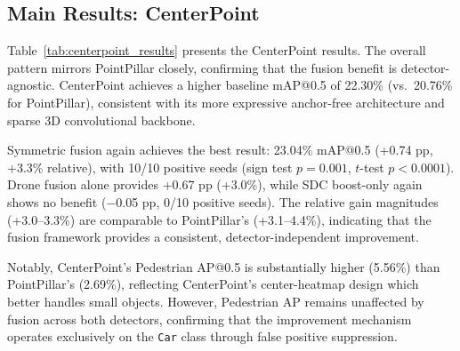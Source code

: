 \documentclass[sustainability,article,submit,moreauthors,pdftex]{Definitions/mdpi}
\begin{document}
\subsection{Main Results: CenterPoint}

Table~\ref{tab:centerpoint_results} presents the CenterPoint results. The overall pattern mirrors PointPillar closely, confirming that the fusion benefit is detector-agnostic. CenterPoint achieves a higher baseline mAP@0.5 of 22.30\% (vs.\ 20.76\% for PointPillar), consistent with its more expressive anchor-free architecture and sparse 3D convolutional backbone.

Symmetric fusion again achieves the best result: 23.04\% mAP@0.5 (+0.74 pp, +3.3\% relative), with 10/10 positive seeds (sign test $p = 0.001$, $t$-test $p < 0.0001$). Drone fusion alone provides +0.67 pp (+3.0\%), while SDC boost-only again shows no benefit ($-$0.05 pp, 0/10 positive seeds). The relative gain magnitudes (+3.0--3.3\%) are comparable to PointPillar's (+3.1--4.4\%), indicating that the fusion framework provides a consistent, detector-independent improvement.

Notably, CenterPoint's Pedestrian AP@0.5 is substantially higher (5.56\%) than PointPillar's (2.69\%), reflecting CenterPoint's center-heatmap design which better handles small objects. However, Pedestrian AP remains unaffected by fusion across both detectors, confirming that the improvement mechanism operates exclusively on the \texttt{Car} class through false positive suppression.
\end{document}
